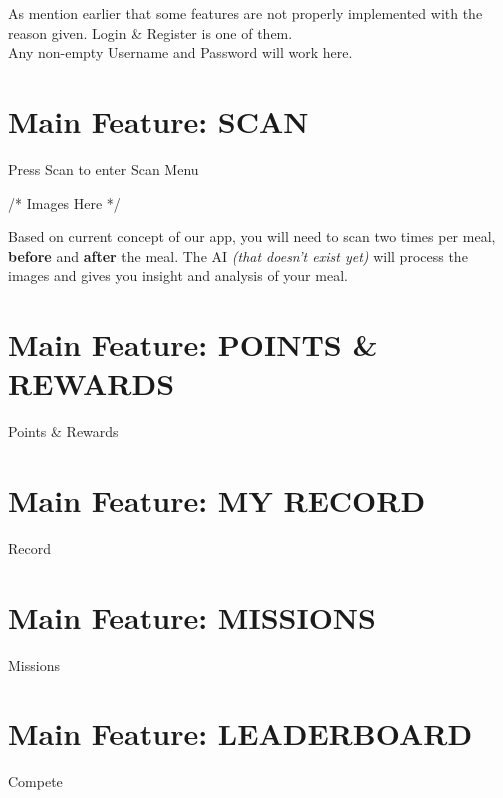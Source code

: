 \documentclass[a4paper,12pt]{article}
\begin{document}
As mention earlier that some features are not properly implemented with the reason given.
Login \& Register is one of them. \\

Any non-empty Username and Password will work here.

\section{Main Feature: SCAN}

Press Scan to enter Scan Menu

/* Images Here */

Based on current concept of our app, you will need to scan two times per meal,
\textbf{before} and \textbf{after} the meal. The AI \textit{(that doesn't exist yet)} will
process the images and gives you insight and analysis of your meal.

\section{Main Feature: POINTS \& REWARDS}

Points \& Rewards

\section{Main Feature: MY RECORD}

Record

\section{Main Feature: MISSIONS}

Missions

\section{Main Feature: LEADERBOARD}

Compete
\end{document}
